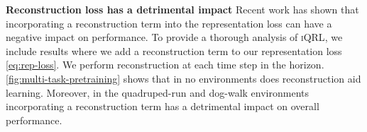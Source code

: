 \documentclass{article}
\theoremstyle{plain}
\theoremstyle{definition}
\theoremstyle{remark}
\newcommand{\our}{\textsc{iQRL}\xspace}
\begin{document}






\textbf{Reconstruction loss has a detrimental impact}
Recent work \citep{zhaoSimplifiedTemporalConsistency2023,hansenTemporalDifferenceLearning2022}
has shown that incorporating a reconstruction term into the representation loss can have a negative impact on performance.
To provide a thorough analysis of \our, we include results where we add a reconstruction term to our
representation loss \cref{eq:rep-loss}.
We perform reconstruction at each time step in the horizon.
\cref{fig:multi-task-pretraining} shows that in no environments does reconstruction aid learning.
Moreover, in the quadruped-run and dog-walk environments incorporating a reconstruction term has a detrimental impact on
overall performance.
\end{document}
